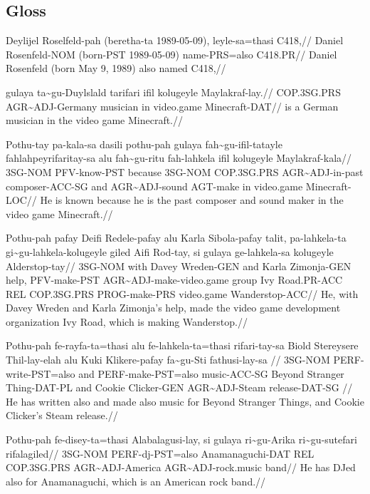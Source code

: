 \newpage

\subsection*{Gloss}

\ex
\begingl
          \gla  Deylijel Roselfeld-pah (beretha-ta 1989-05-09), leyle-sa=thasi C418,//
          \glb  Daniel Rosenfeld-NOM (born-PST 1989-05-09) name-PRS=also C418.PR//
          \glft Daniel Rosenfeld (born May 9, 1989) also named C418,//
\endgl
\xe

\ex
\begingl
          \gla  gulaya ta\~{}gu-Duylslald tarifari ifil kolugeyle Maylakraf-lay.//
          \glb  COP.3SG.PRS AGR\~{}ADJ-Germany musician in video.game Minecraft-DAT//
          \glft is a German musician in the video game Minecraft.//
\endgl
\xe

\ex
\begingl
          \gla  Pothu-tay pa-kala-sa dasili pothu-pah gulaya fah\~{}gu-ifil-tatayle fahlahpeyrifaritay-sa alu fah\~{}gu-ritu fah-lahkela ifil kolugeyle Maylakraf-kala//
          \glb  3SG-NOM PFV-know-PST because 3SG-NOM COP.3SG.PRS AGR\~{}ADJ-in-past composer-ACC-SG and AGR\~{}ADJ-sound AGT-make in video.game Minecraft-LOC//
          \glft He is known because he is the past composer and sound maker in the video game Minecraft.//
\endgl
\xe

\ex
\begingl
          \gla  Pothu-pah pafay Deifi Redele-pafay alu Karla Sibola-pafay talit, pa-lahkela-ta gi\~{}gu-lahkela-kolugeyle giled Aifi Rod-tay, si gulaya ge-lahkela-sa kolugeyle Alderstop-tay//
          \glb  3SG-NOM with Davey Wreden-GEN and Karla Zimonja-GEN help, PFV-make-PST AGR\~{}ADJ-make-video.game group Ivy Road.PR-ACC REL COP.3SG.PRS PROG-make-PRS video.game Wanderstop-ACC//
          \glft He, with Davey Wreden and Karla Zimonja's help, made the video game development organization Ivy Road, which is making Wanderstop.//
\endgl
\xe

\ex
\begingl
          \gla  Pothu-pah fe-rayfa-ta=thasi   alu fe-lahkela-ta=thasi rifari-tay-sa  Biold   Stereysere Thil-lay-elah alu Kuki   Klikere-pafay fa\~{}gu-Sti     fathusi-lay-sa  //
          \glb  3SG-NOM   PERF-write-PST=also and PERF-make-PST=also  music-ACC-SG   Beyond  Stranger   Thing-DAT-PL  and Cookie Clicker-GEN   AGR\~{}ADJ-Steam release-DAT-SG //
          \glft He has written also and made also music for Beyond Stranger Things, and Cookie Clicker's Steam release.//
\endgl
\xe

\ex
\begingl
          \gla  Pothu-pah fe-disey-ta=thasi Alabalagusi-lay, si  gulaya      ri\~{}gu-Arika     ri\~{}gu-sutefari     rifalagiled//
          \glb  3SG-NOM   PERF-dj-PST=also  Anamanaguchi-DAT REL COP.3SG.PRS AGR\~{}ADJ-America AGR\~{}ADJ-rock.music band//
          \glft He has DJed also for Anamanaguchi, which is an American rock band.//
\endgl
\xe

